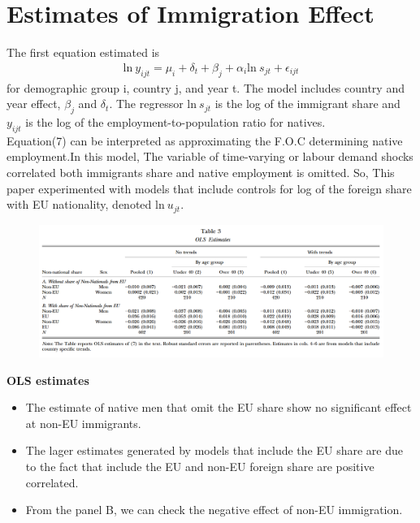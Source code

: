 \documentclass[../root]{subfiles}
\begin{document}
    \section{Estimates of Immigration Effect}
    The first equation estimated is 
    \begin{align}
        \mbox{ln} \ y_{ijt}= \mu_i + \delta_t + \beta_j +\alpha_i \mbox{ln} \ s_{jt} +\epsilon_{ijt}
    \end{align}
    for demographic group i, country j, and year t. The model includes country and year effect, $\beta_j$ and $\delta_t$.
    The regressor $\mbox{ln} \ s_{jt}$ is the log of the immigrant share and $y_{ijt}$ is the log of the employment-to-population ratio for natives. \\
    Equation(7) can be interpreted as approximating the F.O.C determining native employment.In this model, The variable of time-varying or labour demand shocks correlated both immigrants share and native employment is omitted. 
    So, This paper experimented with models that include controls for log of the foreign share with EU nationality, denoted $\mbox{ln} \ u_{jt}$.

    \begin{figure}[h]
        \includegraphics[width=15cm]{0529sugiyama/Table3.png}
    \end{figure}
    
    {\bf OLS estimates}
    \begin{itemize}
        \item The estimate of native men that omit the EU share show no significant effect at non-EU immigrants. 
        \item  The lager estimates generated by models that include the EU share are due to the fact that include the EU and non-EU foreign share are positive correlated.
        \item From the panel B, we can check the negative effect of non-EU immigration.
    \end{itemize}
    
\end{document}
